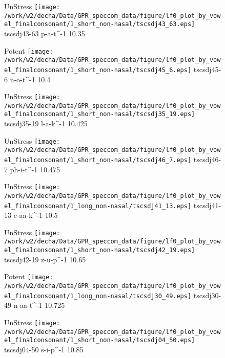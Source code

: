 \documentclass{article}
\begin{document}
\begin{figure}[t]
\begin{minipage}[b]{.24\textwidth}
UnStress
\centering
\texttt{[image: /work/w2/decha/Data/GPR\_speccom\_data/figure/lf0\_plot\_by\_vowel\_finalconsonant/1\_short\_non-nasal/tscsdj43\_63.eps]}
tscsdj43-63 p-a-t\textasciicircum-1 10.35
\end{minipage}
\begin{minipage}[b]{.24\textwidth}
\colorbox{Apricot}{Potent}
\centering
\texttt{[image: /work/w2/decha/Data/GPR\_speccom\_data/figure/lf0\_plot\_by\_vowel\_finalconsonant/1\_short\_non-nasal/tscsdj45\_6.eps]}
tscsdj45-6 n-o-t\textasciicircum-1 10.4
\end{minipage}
\begin{minipage}[b]{.24\textwidth}
UnStress
\centering
\texttt{[image: /work/w2/decha/Data/GPR\_speccom\_data/figure/lf0\_plot\_by\_vowel\_finalconsonant/1\_short\_non-nasal/tscsdj35\_19.eps]}
tscsdj35-19 l-a-k\textasciicircum-1 10.425
\end{minipage}
\begin{minipage}[b]{.24\textwidth}
UnStress
\centering
\texttt{[image: /work/w2/decha/Data/GPR\_speccom\_data/figure/lf0\_plot\_by\_vowel\_finalconsonant/1\_short\_non-nasal/tscsdj46\_7.eps]}
tscsdj46-7 ph-i-t\textasciicircum-1 10.475
\end{minipage}
\end{figure}

\begin{figure}[t]
\begin{minipage}[b]{.24\textwidth}
UnStress
\centering
\texttt{[image: /work/w2/decha/Data/GPR\_speccom\_data/figure/lf0\_plot\_by\_vowel\_finalconsonant/1\_long\_non-nasal/tscsdj41\_13.eps]}
tscsdj41-13 c-aa-k\textasciicircum-1 10.5
\end{minipage}
\begin{minipage}[b]{.24\textwidth}
UnStress
\centering
\texttt{[image: /work/w2/decha/Data/GPR\_speccom\_data/figure/lf0\_plot\_by\_vowel\_finalconsonant/1\_short\_non-nasal/tscsdj42\_19.eps]}
tscsdj42-19 z-u-p\textasciicircum-1 10.65
\end{minipage}
\begin{minipage}[b]{.24\textwidth}
\colorbox{Apricot}{Potent}
\centering
\texttt{[image: /work/w2/decha/Data/GPR\_speccom\_data/figure/lf0\_plot\_by\_vowel\_finalconsonant/1\_long\_non-nasal/tscsdj30\_49.eps]}
tscsdj30-49 n-aa-t\textasciicircum-1 10.725
\end{minipage}
\begin{minipage}[b]{.24\textwidth}
UnStress
\centering
\texttt{[image: /work/w2/decha/Data/GPR\_speccom\_data/figure/lf0\_plot\_by\_vowel\_finalconsonant/1\_short\_non-nasal/tscsdj04\_50.eps]}
tscsdj04-50 s-i-p\textasciicircum-1 10.85
\end{minipage}
\end{figure}
\end{document}

